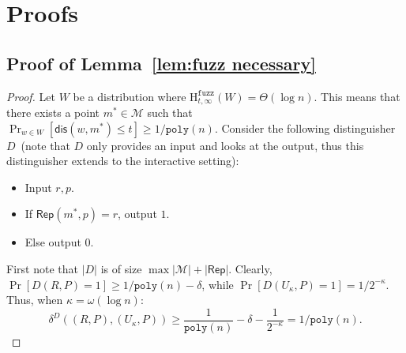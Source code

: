 \documentclass[11pt]{article}
\newcommand{\lemref}[1]{\mbox{Lemma~\ref{#1}}}
\newcommand{\class}[1]{{\ensuremath{\mathsf{#1}}}}
\newcommand{\rep}{\ensuremath{\class{Rep}}\xspace}
\newcommand{\dis}{\ensuremath{\mathsf{dis}}}
\newcommand{\poly}{\ensuremath{\mathtt{poly}}\xspace}
\newcommand{\Hfuzz}{\mathrm{H}^{\mathtt{fuzz}}_{t,\infty}}
\begin{document}
\section{Proofs}
\subsection{Proof of \lemref{lem:fuzz necessary}}
\label{sec:proof fuzz necessary}
\begin{proof}
Let $W$ be a distribution where $\Hfuzz(W) = \Theta(\log n)$.  This means that there exists a point $m^*\in \mathcal{M}$ such that $\Pr_{w\in W}[\dis (w, m^*)\leq t] \geq 1/\poly(n)$.  Consider the following distinguisher $D$~(note that $D$ only provides an input and looks at the output, thus this distinguisher extends to the interactive setting):
\begin{itemize}
\item Input $r, p$.
\item If $\rep(m^*, p) = r$, output $1$.
\item Else output $0$.
\end{itemize}
First note that $|D|$ is of size $\max |\mathcal{M}|+ |\rep|$.  Clearly, $\Pr[D(R, P) = 1]\geq 1/\poly(n) - \delta$, while $\Pr[D(U_\kappa, P)=1 ]= 1/2^{-\kappa}$.  Thus, when $\kappa = \omega(\log n)$:
\[
\delta^D((R, P), (U_\kappa, P))\geq \frac{1}{\poly(n)} -\delta -  \frac{1}{2^{-\kappa}} = 1/\poly(n).
\]
\end{proof}
\end{document}

